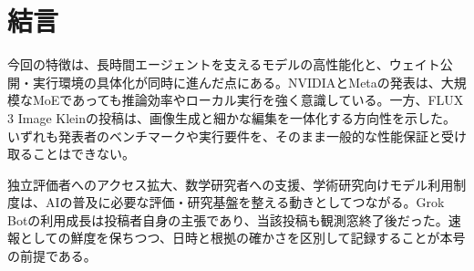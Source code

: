 \section*{結言}
今回の特徴は、長時間エージェントを支えるモデルの高性能化と、ウェイト公開・実行環境の具体化が同時に進んだ点にある。NVIDIAとMetaの発表は、大規模なMoEであっても推論効率やローカル実行を強く意識している。一方、FLUX 3 Image Kleinの投稿は、画像生成と細かな編集を一体化する方向性を示した。いずれも発表者のベンチマークや実行要件を、そのまま一般的な性能保証と受け取ることはできない。

独立評価者へのアクセス拡大、数学研究者への支援、学術研究向けモデル利用制度は、AIの普及に必要な評価・研究基盤を整える動きとしてつながる。Grok Botの利用成長は投稿者自身の主張であり、当該投稿も観測窓終了後だった。速報としての鮮度を保ちつつ、日時と根拠の確かさを区別して記録することが本号の前提である。
